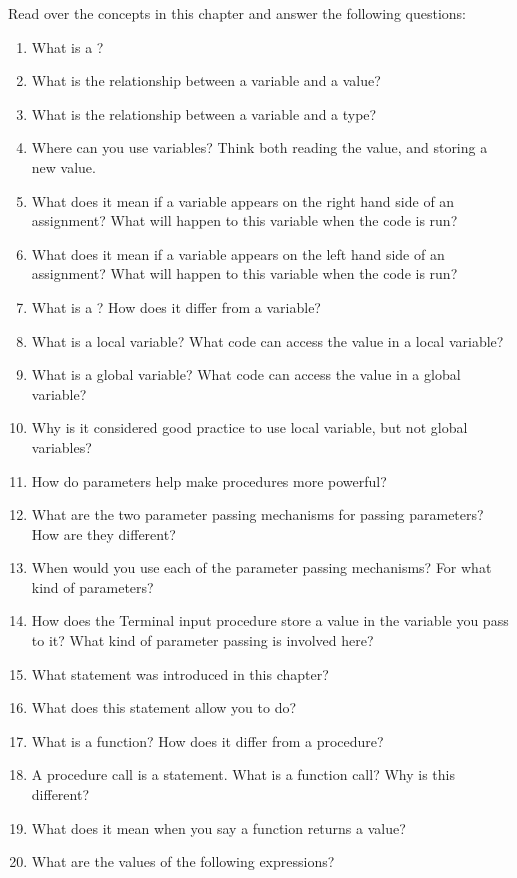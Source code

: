 Read over the concepts in this chapter and answer the following questions:
\begin{enumerate}
  \item What is a ?
  \item What is the relationship between a variable and a value?
  \item What is the relationship between a variable and a type?
  \item Where can you use variables? Think both reading the value, and storing a new value.
  \item What does it mean if a variable appears on the right hand side of an assignment? What will happen to this variable when the code is run?
  \item What does it mean if a variable appears on the left hand side of an assignment? What will happen to this variable when the code is run?
  \item What is a ? How does it differ from a variable?
  \item What is a local variable? What code can access the value in a local variable?
  \item What is a global variable? What code can access the value in a global variable?
  \item Why is it considered good practice to use local variable, but not global variables?
  \item How do parameters help make procedures more powerful?
  \item What are the two parameter passing mechanisms for passing parameters? How are they different?
  \item When would you use each of the parameter passing mechanisms? For what kind of parameters?
  \item How does the Terminal input procedure store a value in the variable you pass to it? What kind of parameter passing is involved here?
  \item What statement was introduced in this chapter?
  \item What does this statement allow you to do?
  \item What is a function? How does it differ from a procedure?
  \item A procedure call is a statement. What is a function call? Why is this different?
  \item What does it mean when you say a function returns a value? 
  \item What are the values of the following expressions?
  

\end{enumerate}
